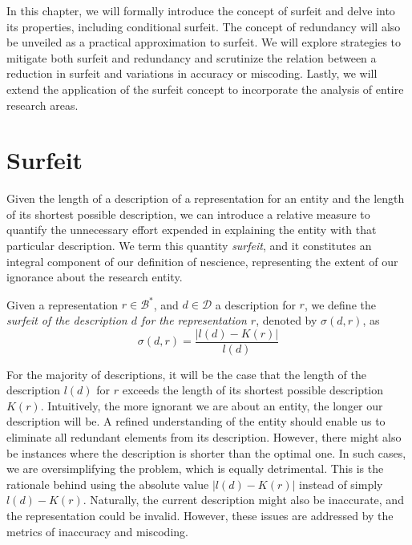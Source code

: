 In this chapter, we will formally introduce the concept of surfeit and delve into its properties, including conditional surfeit. The concept of redundancy will also be unveiled as a practical approximation to surfeit. We will explore strategies to mitigate both surfeit and redundancy and scrutinize the relation between a reduction in surfeit and variations in accuracy or miscoding. Lastly, we will extend the application of the surfeit concept to incorporate the analysis of entire research areas.


%
%

\section{Surfeit}
\label{sec:Definition_redundancy}

Given the length of a description of a representation for an entity and the length of its shortest possible description, we can introduce a relative measure to quantify the unnecessary effort expended in explaining the entity with that particular description. We term this quantity \emph{surfeit}, and it constitutes an integral component of our definition of nescience, representing the extent of our ignorance about the research entity.

\begin{definition}[Surfeit]
Given a representation $r \in \mathcal{B}^\ast$, and $d \in \mathcal{D}$ a description for $r$, we define the \emph{surfeit of the description $d$ for the representation $r$}, denoted by $\sigma(d, r)$, as
\[
\sigma (d, r) = \frac{ | l(d) - K(r) |}{l(d)}
\]
\end{definition}

For the majority of descriptions, it will be the case that the length of the description $l(d)$ for $r$ exceeds the length of its shortest possible description $K(r)$. Intuitively, the more ignorant we are about an entity, the longer our description will be. A refined understanding of the entity should enable us to eliminate all redundant elements from its description. However, there might also be instances where the description is shorter than the optimal one. In such cases, we are oversimplifying the problem, which is equally detrimental. This is the rationale behind using the absolute value $| l(d) - K(r) |$ instead of simply $l(d) - K(r)$. Naturally, the current description might also be inaccurate, and the representation could be invalid. However, these issues are addressed by the metrics of inaccuracy and miscoding.

